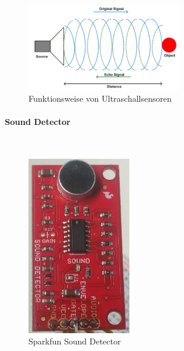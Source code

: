 \begin{figure}[H]
        \centering
        \includegraphics[width=0.6\textwidth]{images/ultraschall_prinzip.png}
        \caption{Funktionsweise von Ultraschallsensoren}
        \label{img:ultraschall_prinzip}
\end{figure}

\paragraph{Sound Detector}\mbox{}\\

\begin{figure}[H]
        \centering
        \includegraphics[width=0.4\textwidth]{images/sounddetector.png}
        \caption{Sparkfun Sound Detector}
        \label{img:sound}
\end{figure}


